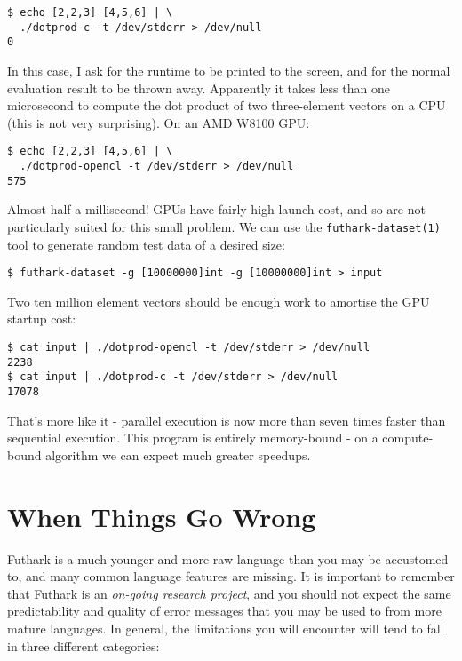 \documentclass[11pt]{book}
\begin{document}
\begin{verbatim}
$ echo [2,2,3] [4,5,6] | \
  ./dotprod-c -t /dev/stderr > /dev/null
0
\end{verbatim}

In this case, I ask for the runtime to be printed to the screen, and
for the normal evaluation result to be thrown away.  Apparently it
takes less than one microsecond to compute the dot product of two
three-element vectors on a CPU (this is not very surprising).  On an
AMD W8100 GPU:

\begin{verbatim}
$ echo [2,2,3] [4,5,6] | \
  ./dotprod-opencl -t /dev/stderr > /dev/null
575
\end{verbatim}

Almost half a millisecond!  GPUs have fairly high launch cost, and so
are not particularly suited for this small problem.  We can use the
\texttt{futhark-dataset(1)} tool to generate random test data of a
desired size:

\begin{verbatim}
$ futhark-dataset -g [10000000]int -g [10000000]int > input
\end{verbatim}

Two ten million element vectors should be enough work to amortise the
GPU startup cost:

\begin{verbatim}
$ cat input | ./dotprod-opencl -t /dev/stderr > /dev/null
2238
$ cat input | ./dotprod-c -t /dev/stderr > /dev/null
17078
\end{verbatim}

That's more like it - parallel execution is now more than seven times
faster than sequential execution.  This program is entirely
memory-bound - on a compute-bound algorithm we can expect much greater
speedups.

\section{When Things Go Wrong}

Futhark is a much younger and more raw language than you may be
accustomed to, and many common language features are missing.  It is
important to remember that Futhark is an \textit{on-going research
  project}, and you should not expect the same predictability and
quality of error messages that you may be used to from more mature
languages.  In general, the limitations you will encounter will tend
to fall in three different categories:
\end{document}
